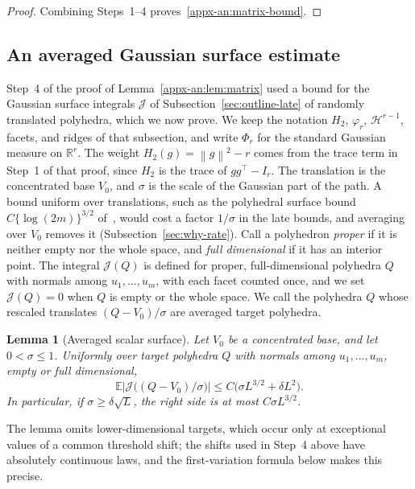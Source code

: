 \documentclass[11pt,letterpaper]{article}
\newif\ifshowrev
\newenvironment{revblock}{\ifshowrev\color{revblue}%
\hypersetup{linkcolor=revblue,citecolor=revblue,urlcolor=revblue}\fi}{}
\newif\ifshowtrim
\newcommand{\trim}[1]{\ifshowtrim{\color{revblue}%
\hypersetup{linkcolor=revblue,citecolor=revblue,urlcolor=revblue}#1}\else#1\fi}
\newif\ifshowlin
\newcommand{\lin}[1]{\ifshowlin{\color{revblue}%
\hypersetup{linkcolor=revblue,citecolor=revblue,urlcolor=revblue}#1}\else#1\fi}
\newif\ifshownat
\newcommand{\nat}[1]{\ifshownat{\color{revblue}%
\hypersetup{linkcolor=revblue,citecolor=revblue,urlcolor=revblue}#1}\else#1\fi}
\newtheorem{lemma}{Lemma}
\theoremstyle{remark}
\newcommand{\E}{\mathbb E}
\newcommand{\R}{\mathbb R}
\newcommand{\norm}[1]{\left\lVert#1\right\rVert}
\newcommand{\surf}{\mathcal J}
\begin{document}
\begin{revblock}
\begin{proof}
Combining Steps~1--4 proves~\eqref{appx-an:matrix-bound}.
\end{proof}

\subsection{An averaged Gaussian surface estimate}
\label{appx-an:sec:surface}

Step~4 of the proof of Lemma~\ref{appx-an:lem:matrix} used a bound for
\trim{the} Gaussian surface integrals \trim{\(\surf\) of
Subsection~\ref{sec:outline-late}} of randomly translated polyhedra,
which we now prove. \trim{We keep the notation \(H_2\), \(\varphi_r\),
\(\mathcal H^{r-1}\), facets, and ridges of that subsection, and write
\(\Phi_r\) for the standard Gaussian measure on \(\R^r\).}
\trim{The weight \(H_2(g)=\norm g^2-r\) comes from the trace term in
Step~1 of that proof, since \(H_2\) is the trace of \(gg^\top-I_r\). The
translation is the concentrated base \(V_0\), and \(\sigma\) is the scale
of the Gaussian part of the path. A bound uniform over translations,
\nat{such as the polyhedral surface bound \(C\{\log(2m)\}^{3/2}\) of~\cite[Proposition~4]{GaoZhang},} would cost a factor \(1/\sigma\)
in the late bounds, and averaging over \(V_0\) removes it
(Subsection~\ref{sec:why-rate}).} Call a
polyhedron \emph{proper} if it is neither empty nor the whole space, and
\emph{full dimensional} if it has an interior point. \trim{The integral
\(\surf(Q)\) is defined for} proper, full-dimensional \trim{polyhedra} \(Q\)
with normals among \(u_1,\ldots,u_m\), \trim{with} each facet counted
once\trim{, and we} set \(\surf(Q)=0\) when \(Q\) is empty or the whole
space. \lin{We call the polyhedra \(Q\) whose rescaled translates
\((Q-V_0)/\sigma\) are averaged target polyhedra.}

\begin{lemma}[Averaged scalar surface]\label{appx-an:lem:surface}
Let \(V_0\) be a concentrated base, and let \(0<\sigma\le1\). Uniformly
over target polyhedra \(Q\) with normals among \(u_1,\ldots,u_m\), empty
or full dimensional,
\begin{equation}
 \E\left|\surf\bigl((Q-V_0)/\sigma\bigr)\right|
 \le C\bigl(\sigma L^{3/2}+\delta L^2\bigr).
 \label{appx-an:surface-bound}
\end{equation}
In particular, if \(\sigma\ge\delta\sqrt L\), the right side is at most
\(C\sigma L^{3/2}\).
\end{lemma}

The lemma omits lower-dimensional targets, which occur only at
exceptional values of a common threshold shift; the shifts used in
Step~4 above have absolutely continuous laws, and the first-variation
formula below makes this precise.


\end{revblock}
\end{document}
